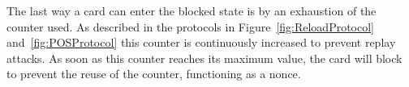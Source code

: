 The last way a card can enter the blocked state is by an exhaustion of the counter used.
As described in the protocols in Figure~\ref{fig:ReloadProtocol} and~\ref{fig:POSProtocol} this counter is continuously increased to prevent replay attacks.
As soon as this counter reaches its maximum value, the card will block to prevent the reuse of the counter, functioning as a nonce.

